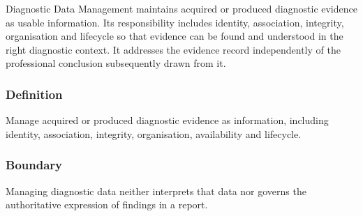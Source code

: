 Diagnostic Data Management maintains acquired or produced diagnostic evidence as usable information. Its responsibility includes identity, association, integrity, organisation and lifecycle so that evidence can be found and understood in the right diagnostic context. It addresses the evidence record independently of the professional conclusion subsequently drawn from it.

\subsubsection*{Definition}

Manage acquired or produced diagnostic evidence as information, including identity, association, integrity, organisation, availability and lifecycle.

\subsubsection*{Boundary}

Managing diagnostic data neither interprets that data nor governs the authoritative expression of findings in a report.

